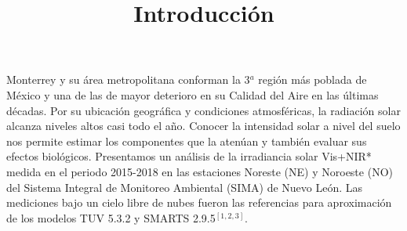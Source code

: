 \title{Introducción}
\hspace{-0.cm}
\begin{minipage}{0.53\linewidth}
  Monterrey y su área metropolitana conforman la 3$^a$ región más poblada
  de México y una de las de mayor deterioro en su Calidad del Aire en las últimas décadas. Por su ubicación geográfica y condiciones atmosféricas, la radiación solar alcanza niveles altos casi todo el año. Conocer la intensidad solar a nivel del suelo nos permite estimar los componentes que la atenúan y también evaluar sus efectos biológicos. Presentamos un análisis de la irradiancia solar Vis+NIR* medida en el periodo 2015-2018 en las estaciones Noreste (NE) y Noroeste (NO) del Sistema Integral de Monitoreo Ambiental (SIMA) de Nuevo León. Las mediciones bajo un cielo libre de nubes fueron las referencias para aproximación de los modelos TUV 5.3.2 y SMARTS 2.9.5$^{\left[1,2,3\right]}$.\\
\end{minipage}